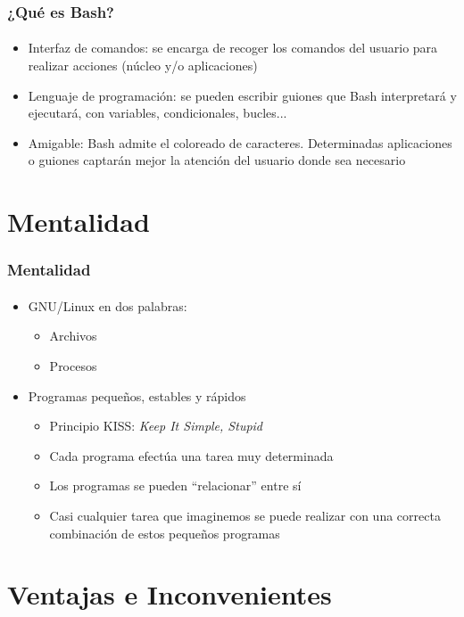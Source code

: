 \documentclass[12pt]{beamer}
\begin{document}
\begin{frame}
  \frametitle{¿Qué es Bash?}
  \framesubtitle{}
  \begin{itemize}
    \item Interfaz de comandos: se encarga de recoger los comandos del usuario para realizar acciones (núcleo y/o aplicaciones)
    \medskip
    \pause
    \item Lenguaje de programación: se pueden escribir guiones que Bash interpretará y ejecutará, con variables, condicionales, bucles...
    \medskip
    \pause
    \item Amigable: Bash admite el coloreado de caracteres. Determinadas aplicaciones o guiones captarán mejor la atención del usuario donde sea necesario
  \end{itemize}
\end{frame}


\section{Mentalidad}

\begin{frame}
  \frametitle{Mentalidad}
  \framesubtitle{}
  \begin{itemize}
    \item GNU/Linux en dos palabras:
    \medskip
    \begin{itemize}
      \item Archivos
      \medskip
      \item Procesos
    \end{itemize}
    \bigskip
    \pause
    \item Programas pequeños, estables y rápidos
    \medskip
    \begin{itemize}
      \item Principio KISS: \textit{Keep It Simple, Stupid}
      \medskip
      \item Cada programa efectúa una tarea muy determinada
      \medskip
      \item Los programas se pueden ``relacionar'' entre sí
      \medskip
      \item Casi cualquier tarea que imaginemos se puede realizar con una correcta combinación de estos pequeños programas
    \end{itemize}
  \end{itemize}

\end{frame}


\section{Ventajas e Inconvenientes}
\end{document}
